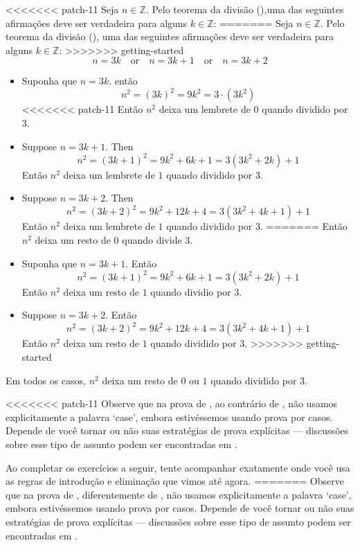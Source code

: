 \begin{itemizar}
\begin{cproof}
<<<<<<< patch-11
Seja $n \in \mathbb{Z}$. Pelo teorema da divisão (),uma das seguintes afirmações deve ser verdadeira para alguns $k \in \mathbb{Z}$:
=======
Seja $n \in \mathbb{Z}$. Pelo teorema da divisão (), uma das seguintes afirmações deve ser verdadeira para alguns $k \in \mathbb{Z}$:
>>>>>>> getting-started
\[
n=3k \quad \text{or} \quad n=3k+1 \quad \text{or} \quad n=3k+2
\]
\begin{itemize}
\item Suponha que $n=3k$. então
\[
n^2 = (3k)^2 = 9k^2 = 3 \cdot (3k^2)
\]
<<<<<<< patch-11
Então $n^2$ deixa um lembrete de $0$ quando dividido por $3$.
\item Suppose $n=3k+1$. Then
\[
n^2 = (3k+1)^2 = 9k^2+6k+1 = 3(3k^2+2k)+1
\]
Então $n^2$ deixa um lembrete de $1$ quando dividido por $3$.
\item Suppose $n=3k+2$. Then
\[
n^2 = (3k+2)^2 = 9k^2+12k+4 = 3(3k^2+4k+1)+1
\]
Então $n^2$ deixa um lembrete de $1$ quando dividido por $3$.
=======
Então $n^2$ deixa um resto de $0$ quando divide $3$.
\item Suponha que $n=3k+1$. Então
\[
n^2 = (3k+1)^2 = 9k^2+6k+1 = 3(3k^2+2k)+1
\]
Então $n^2$ deixa um resto de $1$ quando dividio por $3$.
\item Suppose $n=3k+2$. Então
\[
n^2 = (3k+2)^2 = 9k^2+12k+4 = 3(3k^2+4k+1)+1
\]
Então $n^2$ deixa um resto de $1$ quando dividido por $3$.
>>>>>>> getting-started
\end{itemize}
Em todos os casos, $n^2$ deixa um resto de $0$ ou $1$ quando dividido por $3$.
\end{cproof}

<<<<<<< patch-11
Observe que na prova de , ao contrário de , não usamos explicitamente a palavra `case', embora estivéssemos usando prova por casos. Depende de você tornar ou não suas estratégias de prova explícitas --- discussões sobre esse tipo de assunto podem ser encontradas em .

Ao completar os exercícios a seguir, tente acompanhar exatamente onde você usa as regras de introdução e eliminação que vimos até agora.
=======
Observe que na prova de , diferentemente de , não usamos explicitamente a palavra `case', embora estivéssemos usando prova por casos. Depende de você tornar ou não suas estratégias de prova explícitas --- discussões sobre esse tipo de assunto podem ser encontradas em .


\end{itemizar}
